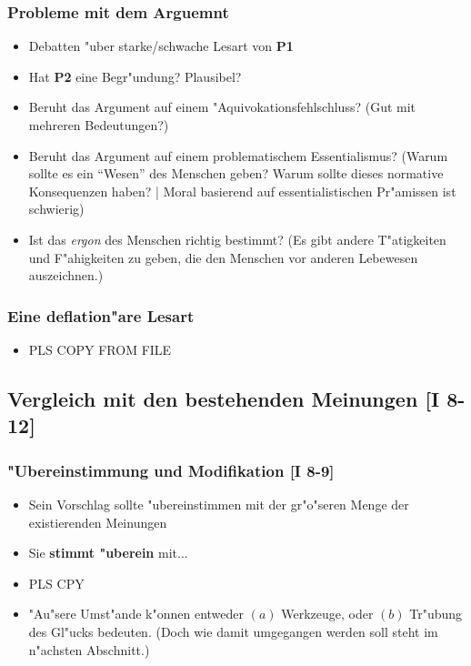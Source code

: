 \documentclass[emulatestandardclasses]{scrartcl}
\begin{document}
\subsubsection{Probleme mit dem Arguemnt}

\begin{itemize}
  \item Debatten "uber starke/schwache Lesart von \textbf{P1}
  \item Hat \textbf{P2} eine Begr"undung? Plausibel?
  \item Beruht das Argument auf einem "Aquivokationsfehlschluss? (Gut mit mehreren Bedeutungen?)
  \item Beruht das Argument auf einem problematischem Essentialismus? (Warum sollte es ein "`Wesen"' des Menschen geben? Warum sollte dieses normative Konsequenzen haben? | Moral basierend auf essentialistischen Pr"amissen ist schwierig)
  \item Ist das \emph{ergon} des Menschen richtig bestimmt? (Es gibt andere T"atigkeiten und F"ahigkeiten zu geben, die den Menschen vor anderen Lebewesen auszeichnen.)
\end{itemize}

\subsubsection{Eine deflation"are Lesart}

\begin{itemize}
  \item PLS COPY FROM FILE
\end{itemize}


\subsection{Vergleich mit den bestehenden Meinungen [I 8-12]}

\subsubsection{"Ubereinstimmung und Modifikation [I 8-9]}

\begin{itemize}
  \item Sein Vorschlag sollte "ubereinstimmen mit der gr"o"seren Menge der existierenden Meinungen
  \item Sie \textbf{stimmt "uberein} mit...
  \item PLS CPY
  \item "Au"sere Umst"ande k"onnen entweder $(a)$ Werkzeuge, oder $(b)$ Tr"ubung des Gl"ucks bedeuten. (Doch wie damit umgegangen werden soll steht im n"achsten Abschnitt.)
\end{itemize}
\end{document}
